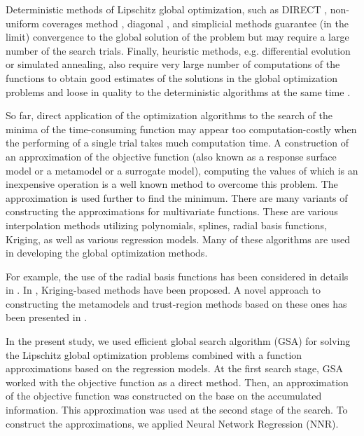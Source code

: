 \documentclass[sensors,article,submit,moreauthors,pdftex]{Definitions/mdpi}
\begin{document}
Deterministic methods of Lipschitz global optimization, such as DIRECT \cite{Jones2009}, non-uniform coverages method \cite{Evtushenko2009, Evtushenko2013}, diagonal \cite{Sergeyev2017}, and simplicial \cite{Zilinskas2014} methods guarantee (in the limit) convergence to the global solution of the problem but may require a large number of the search trials.
Finally, heuristic methods, e.g. differential evolution or simulated annealing, also require very large number of computations of the functions to obtain good estimates of the solutions in the global optimization problems and loose in quality to the deterministic algorithms at the same time \cite{Sergeyev2018,Kvasov2018}.

So far, direct application of the optimization algorithms to the search of the minima of the time-consuming function may appear too computation-costly when the performing of a single trial takes much computation time.
A construction of an approximation of the objective function (also known as a response surface model or a metamodel or a surrogate model), computing the values of which is an inexpensive operation is a well known method to overcome this problem. The approximation is used further to find the minimum.
There are many variants of constructing the approximations for multivariate functions. These are various interpolation methods utilizing polynomials, splines, radial basis functions, Kriging, as well as various regression models. Many of these algorithms are used in developing the global optimization methods.

For example, the use of the radial basis functions has been considered in details in \cite{Gutmann2001,Regis2005}. In \cite{Jones1998,UrRehman2014,Ollar2017_1}, Kriging-based methods have been proposed. A novel approach to constructing the metamodels and trust-region methods based on these ones has been presented in \cite{Polynkin2012,Ollar2017_2,Toropov2018}. 

In the present study, we used efficient global search algorithm (GSA) \cite{Strongin2000,Sergeyev2013} for solving the Lipschitz global optimization problems combined with a function approximations based on the regression models. At the first search stage, GSA worked with the objective function as a direct method. Then, an approximation of the objective function was constructed on the base on the accumulated information. This approximation was used at the second stage of the search.
To construct the approximations, we applied Neural Network Regression (NNR).
\end{document}
